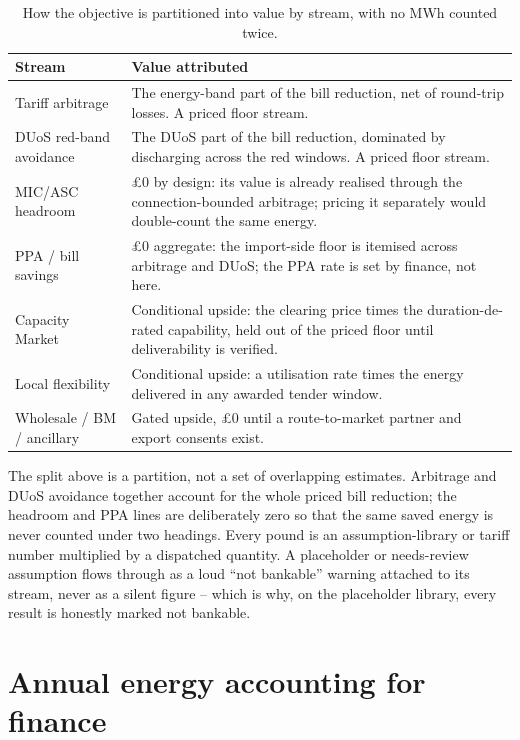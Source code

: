 \begin{table}[H]
\centering
\caption{How the objective is partitioned into value by stream, with no MWh counted twice.}
\label{tab:streams}
\small\sffamily
\begin{tabularx}{\textwidth}{@{}l L@{}}
\toprule
\textbf{Stream} & \textbf{Value attributed} \\
\midrule
Tariff arbitrage & The energy-band part of the bill reduction, net of round-trip losses. A priced floor stream. \\
DUoS red-band avoidance & The DUoS part of the bill reduction, dominated by discharging across the red windows. A priced floor stream. \\
MIC/ASC headroom & \pounds0 by design: its value is already realised through the connection-bounded arbitrage; pricing it separately would double-count the same energy. \\
PPA / bill savings & \pounds0 aggregate: the import-side floor is itemised across arbitrage and DUoS; the PPA rate is set by finance, not here. \\
Capacity Market & Conditional upside: the clearing price times the duration-de-rated capability, held out of the priced floor until deliverability is verified. \\
Local flexibility & Conditional upside: a utilisation rate times the energy delivered in any awarded tender window. \\
Wholesale / BM / ancillary & Gated upside, \pounds0 until a route-to-market partner and export consents exist. \\
\bottomrule
\end{tabularx}
\end{table}

\begin{caution}
The split above is a partition, not a set of overlapping estimates. Arbitrage and DUoS avoidance together account for the whole priced bill reduction; the headroom and PPA lines are deliberately zero so that the same saved energy is never counted under two headings. Every pound is an assumption-library or tariff number multiplied by a dispatched quantity. A placeholder or needs-review assumption flows through as a loud ``not bankable'' warning attached to its stream, never as a silent figure -- which is why, on the  placeholder library, every result is honestly marked not bankable.
\end{caution}

\section{Annual energy accounting for finance}

